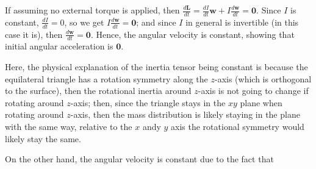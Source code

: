 \documentclass{article}
\newcommand{\bw}{\textbf{w}} %
\newcommand{\bzero}{\textbf{0}}
\begin{document}
If assuming no external torque is applied, then $\frac{d\textbf{L}}{dt}=\frac{dI}{dt}\bw + I\frac{d\bw}{dt}=\bzero$. Since $I$ is constant, $\frac{dI}{dt}=0$, so we get $I\frac{d\bw}{dt}=\bzero$; and since $I$ in general is invertible (in this case it is), then $\frac{d\bw}{dt}=\bzero$. Hence, the angular velocity is constant, showing that initial angular acceleration is $\bzero$.

Here, the physical explanation of the inertia tensor being constant is because the equilateral triangle has a rotation symmetry along the $z$-axis (which is orthogonal to the surface), then the rotational inertia around $z$-axis is not going to change if rotating around $z$-axis; then, since the triangle stays in the $xy$ plane when rotating around $z$-axis, then the mass distribution is likely staying in the plane with the same way, relative to the $x$ andy $y$ axis the rotational symmetry would likely stay the same. 

On the other hand, the angular velocity is constant due to the fact that 
\end{document}
